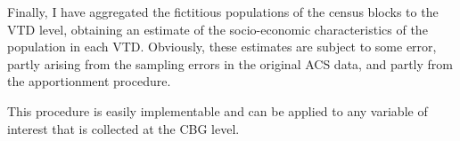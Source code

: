 Finally, I have aggregated the fictitious populations of the census blocks to the VTD level, obtaining an estimate of the socio-economic characteristics of the population in each VTD.
Obviously, these estimates are subject to some error, partly arising from the sampling errors in the original ACS data, and partly from the apportionment procedure.


This procedure is easily implementable and can be applied to any variable of interest that is collected at the CBG level.
